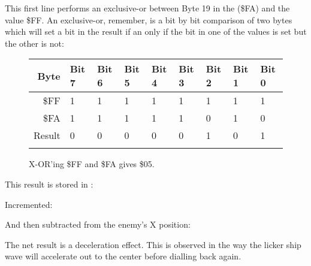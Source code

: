 %


This first line  performs an exclusive-or between Byte 19 in the  (\$FA) and the value \$FF. An exclusive-or,
remember, is a bit by bit comparison of two bytes which will set a bit in the result if an only if the bit in one of the
values is set but the other is not:

\begin{figure}[H]
  {
    \setlength{\tabcolsep}{3.0pt}
    \setlength\cmidrulewidth{\heavyrulewidth} %
    \begin{adjustbox}{width=10cm,center}

      \begin{tabular}{rllllllll}
        \toprule
        Byte & Bit 7 & Bit 6 & Bit 5 & Bit 4 & Bit 3 & Bit 2 & Bit 1 & Bit 0        \\
        \midrule
        \$FF & 1 & 1 & 1 & 1 & 1 & 1 & 1 & 1 \\
        \$FA & 1 & 1 & 1 & 1 & 1 & 0 & 1 & 0 \\
        \midrule
        Result & 0 & 0 & 0 & 0 & 0 & 1 & 0 & 1 \\
        \addlinespace
        \bottomrule
      \end{tabular}

    \end{adjustbox}

    }\caption*{X-OR'ing \$FF and \$FA gives \$05.}
\end{figure}

This result is stored in :
%


Incremented:
%


And then subtracted from the enemy's X position:
%


The net result is a deceleration effect. This is observed in the way the licker ship
wave will accelerate out to the center before dialling back again.


